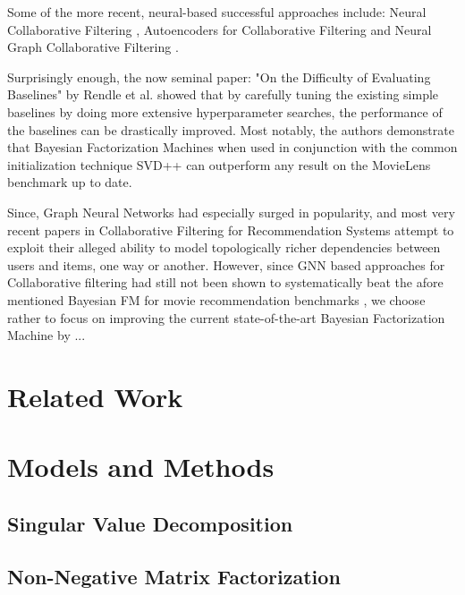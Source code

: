 \documentclass[10pt,conference,compsocconf]{IEEEtran}
\begin{document}
    Some of the more recent, neural-based successful approaches include: Neural Collaborative Filtering \cite{DBLP:journals/corr/abs-1708-05031}, Autoencoders for Collaborative Filtering \cite{inproceedings} and Neural Graph Collaborative Filtering \cite{ngcf}.

    Surprisingly enough, the now seminal paper: "On the Difficulty of Evaluating Baselines" by Rendle et al. \cite{rendle_difficulty_2019} showed that by carefully tuning the existing simple baselines by doing more extensive hyperparameter searches, the performance of the baselines can be drastically improved.
    Most notably, the authors demonstrate that Bayesian Factorization Machines \cite{freudenthaler_bayesian_2011, salakhutdinov_bayesian_2008} when used in conjunction with the common initialization technique SVD++ \cite{koren_factorization_2008} can outperform any result on the MovieLens benchmark up to date.

    Since, Graph Neural Networks had especially surged in popularity, and most very recent papers in Collaborative Filtering for Recommendation Systems attempt to exploit their alleged ability to model topologically richer dependencies between users and items, one way or another.
    However, since GNN based approaches for Collaborative filtering had still not been shown to systematically beat the afore mentioned Bayesian FM for movie recommendation benchmarks \cite{gnn_survey}, we choose rather to focus on improving the current state-of-the-art Bayesian Factorization Machine by ...


    \section{Related Work}


    \section{Models and Methods}


    \subsection{Singular Value Decomposition}

    \subsection{Non-Negative Matrix Factorization}
\end{document}

